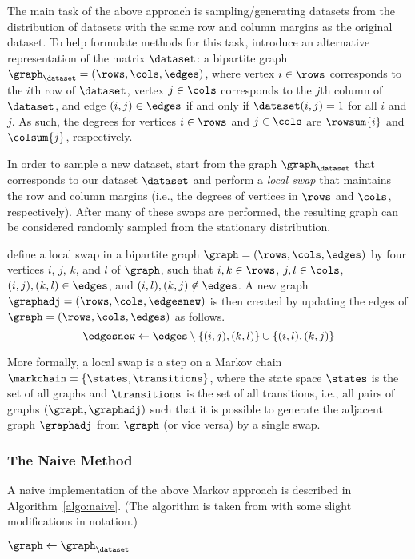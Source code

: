 The main task of the above approach is sampling/generating datasets from the
distribution of datasets with the same row and column margins as the original
dataset. To help formulate methods for this task, \citet{GionisMMT07}
introduce an alternative representation of the matrix $\dataset$: a bipartite
graph $\graph_\dataset = (\rows, \cols, \edges)$, where vertex $i \in \rows$
corresponds to the $i$th row of $\dataset$, vertex $j \in \cols$ corresponds to
the $j$th column of $\dataset$, and edge $(i, j) \in \edges$ if and only if
$\dataset(i, j) = 1$ for all $i$ and $j$. As such, the degrees for vertices $i
\in \rows$ and $j \in \cols$ are $\rowsum{i}$ and $\colsum{j}$, respectively.

In order to sample a new dataset, start from the graph $\graph_\dataset$ that
corresponds to our dataset $\dataset$ and perform a \textit{local swap} that
maintains the row and column margins (i.e., the degrees of vertices in $\rows$
and $\cols$, respectively). After many of these swaps are performed, the
resulting graph can be considered randomly sampled from the stationary
distribution.

\citet{GionisMMT07} define a local swap in a bipartite graph $\graph = (\rows,
\cols, \edges)$ by four vertices $i$, $j$, $k$, and $l$ of $\graph$, such that
$i, k \in \rows$, $j, l \in \cols$, $(i, j), (k, l) \in \edges$, and $(i, l),
(k, j) \notin \edges$. A new graph $\graphadj = (\rows, \cols, \edgesnew)$ is
then created by updating the edges of $\graph = (\rows, \cols, \edges)$ as
follows.
\[
	\edgesnew \leftarrow \edges \setminus \{(i, j), (k, l)\} \cup \{(i, l), (k,
	j)\}
\]

More formally, a local swap is a step on a Markov chain $\markchain = \{\states,
\transitions\}$, where the state space $\states$ is the set of all graphs and
$\transitions$ is the set of all transitions, i.e., all pairs of graphs
$(\graph, \graphadj)$ such that it is possible to generate the adjacent graph
$\graphadj$ from $\graph$ (or vice versa) by a single swap.

\subsubsection{The Naive Method}

A naive implementation of the above Markov approach is described in
Algorithm~\ref{algo:naive}. (The algorithm is taken from \citet{GionisMMT07}
with some slight modifications in notation.)

\begin{algorithm}
	\caption{\naive}\label{algo:naive}
	\DontPrintSemicolon{}

	$\graph \leftarrow \graph_\dataset$\;
	\Return{$\graph$}
\end{algorithm}

